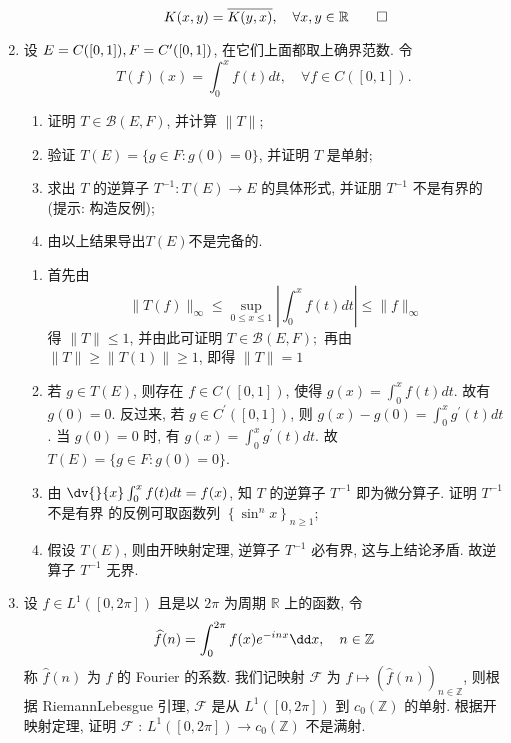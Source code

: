 \begin{enumerate}
\begin{answer}
\begin{enumerate}
            \[
            K(x, y)=\overline{K(y, x)}, \quad \forall x, y \in \mathbb{R} \qedhere
            \]
        \end{enumerate}
    \end{answer}
    \item 设 $E=C([0,1]), F=C^{\prime}([0,1])$, 在它们上面都取上确界范数. 令\[
    T(f)(x)=\int_{0}^{x} f(t) d t, \quad \forall f \in C([0,1]) . 
    \]
        \begin{enumerate}
            \item 证明 $T \in \mathcal{B}(E, F)$, 并计算 $\|T\|$;
            \item  验证 $T(E)=\{g \in F: g(0)=0\}$, 并证明 $T$ 是单射;
            \item  求出 $T$ 的逆算子 $T^{-1}: T(E) \rightarrow E$ 的具体形式, 并证朋 $T^{-1}$ 不是有界的 (提示: 构造反例);
            \item 由以上结果导出$T(E)$不是完备的.
        \end{enumerate}
        \begin{answer}
            \begin{enumerate}
                \item 
                首先由
                \[
                \|T(f)\|_{\infty} \leq \sup _{0 \leq x \leq 1}\left|\int_{0}^{x} f(t) d t\right| \leq\|f\|_{\infty}
                \]
                得 $\|T\| \leq 1$, 并由此可证明 $T \in \mathcal{B}(E, F) ;$ 再由 $\|T\| \geq\|T(1)\| \geq 1$, 即得 $\|T\|=1$
                \item 若 $g \in T(E)$, 则存在 $f \in C([0,1])$, 使得 $g(x)=\int_{0}^{x} f(t) d t$. 故有 $g(0)=0$. 反过来, 若 $g \in C^{\prime}([0,1])$, 则 $g(x)-g(0)=\int_{0}^{x} g^{\prime}(t) d t$. 当 $g(0)=0$ 时, 有 $g(x)=\int_{0}^{x} g^{\prime}(t) d t$. 故 $T(E)=\{g \in F: g(0)=0\}$.
                \item 由 $\dv{}{x} \int_{0}^{x} f(t) d t=f(x)$, 知 $T$ 的逆算子 $T^{-1}$ 即为微分算子. 证明 $T^{-1}$ 不是有界 的反例可取函数列 $\left\{\sin ^{n} x\right\}_{n \geq 1}$;
                \item 假设 $T(E)$, 则由开映射定理, 逆算子 $T^{-1}$ 必有界, 这与上结论矛盾. 故逆算子 $T^{-1}$ 无界.
            \end{enumerate}
        \end{answer}
    \item 设 $f \in L^{1}([0,2 \pi])$ 且是以 $2 \pi$ 为周期 $\mathbb{R}$ 上的函数, 令
    \[
    \widehat{f}(n)=\int_{0}^{2 \pi} f(x) e^{-i n x} \dx, \quad n \in \mathbb{Z}
    \]
    称 $\widehat{f}(n)$ 为 $f$ 的 Fourier 的系数. 我们记映射 $\mathcal{F}$ 为 $f \mapsto(\widehat{f}(n))_{n \in \mathbb{Z}}$, 则根据 RiemannLebesgue 引理, $\mathcal{F}$ 是从 $L^{1}([0,2 \pi])$ 到 $c_{0}(\mathbb{Z})$ 的单射. 根据开映射定理, 证明 $\mathcal{F}$ : $L^{1}([0,2 \pi]) \rightarrow c_{0}(\mathbb{Z})$ 不是满射.

\end{enumerate}
